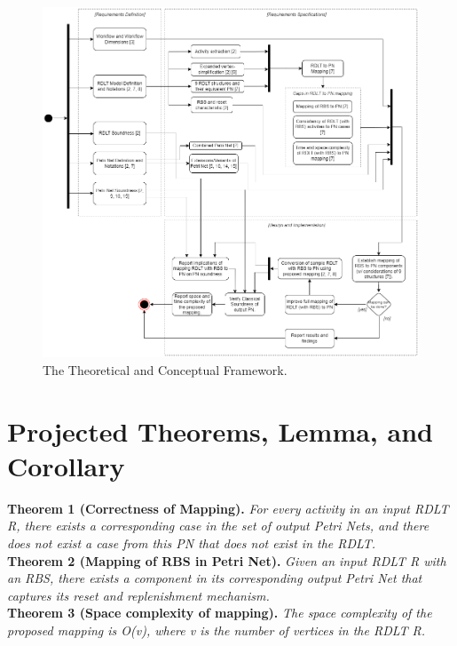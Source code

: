 \documentclass[12pt]{article}
\begin{document}
    \begin{figure}[p]
        \centering
        \includegraphics[scale=0.5]{figures/TCF_V5.png}
        \caption{The Theoretical and Conceptual Framework.}
        \label{tcf}
    \end{figure} \par

    \section{Projected Theorems, Lemma, and Corollary}
    \textbf{Theorem 1 (Correctness of Mapping).} \textit{For every activity in an input RDLT R, there exists a corresponding case in the set of output Petri Nets, and there does not exist a case from this PN that does not exist in the RDLT.} \\

    \noindent \textbf{Theorem 2 (Mapping of RBS in Petri Net).} \textit{Given an input RDLT R with an RBS, there exists a component in its corresponding output Petri Net that captures its reset and replenishment mechanism.} \\

    \noindent \textbf{Theorem 3 (Space complexity of mapping).} \textit{The space complexity of the proposed mapping is O(v), where v is the number of vertices in the RDLT R.} \\
\end{document}
